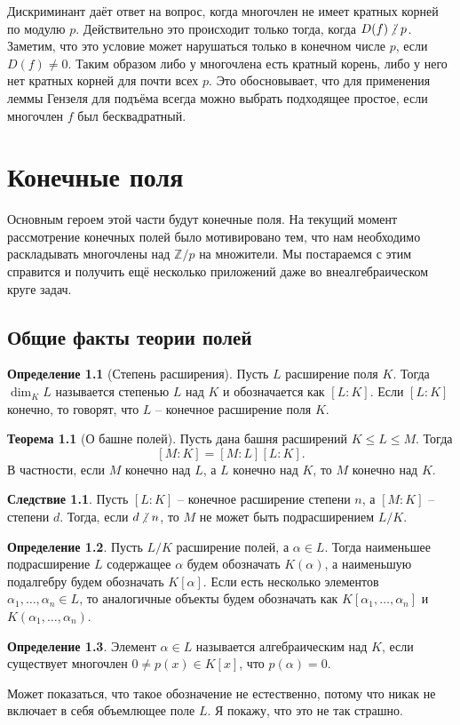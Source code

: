 \documentclass[10pt,a4paper,oneside]{book}
\theoremstyle{definition}
\newtheorem*{defn}{{\color{yellow!20!red} Определение}}
\newtheorem{thm}{{\color{red!40!black} Теорема}}
\newtheorem{cor}{Следствие}
\newcommand{\mb}[1]{\mathbb{#1}}
\newcommand{\ndi}{\mathop{\not\scalebox{0.85}{\raisebox{-1.2pt}[0.5\height]{\vdots}}\,}}
\def\thrm{\begin{thm}}
\def\ethrm{\end{thm}}
\def\dfn{\begin{defn}}
\def\edfn{\end{defn}}
\def\crl{\begin{cor}}
\def\ecrl{\end{cor}}
\begin{document}
Дискриминант даёт ответ на вопрос, когда многочлен не имеет кратных корней по модулю $p$. Действительно это происходит только тогда, когда $D(f)\ndi p$. Заметим, что это условие может нарушаться только в конечном числе $p$, если $D(f)\neq 0$. Таким образом либо у многочлена есть кратный корень, либо у него нет кратных корней для почти всех $p$. Это обосновывает, что для применения леммы Гензеля для подъёма всегда можно выбрать подходящее простое, если многочлен $f$ был бесквадратный.



\chapter{Конечные поля}
Основным героем этой части будут конечные поля. На текущий момент рассмотрение конечных полей было мотивировано тем, что нам необходимо раскладывать многочлены над $\mb Z/p$ на множители. Мы постараемся с этим справится и получить ещё несколько приложений даже во внеалгебраическом круге задач.


\section{Общие факты теории полей}
\dfn[Степень расширения] Пусть $L$ расширение поля $K$. Тогда $\dim_K L$ называется степенью $L$ над $K$ и обозначается как $[L: K]$. Если $[L: K]$ конечно, то говорят, что $L$ -- конечное расширение поля $K$. 
\edfn

\thrm[О башне полей] Пусть дана башня расширений $K\leq L \leq M$. Тогда 
$$[M: K]=[M: L][L: K].$$
В частности, если $M$ конечно над $L$, а $L$ конечно над $K$, то $M$ конечно над $K$.
\ethrm

\crl Пусть $[L: K]$ -- конечное расширение степени $n$, а $[M:K]$ -- степени $d$. Тогда, если $d \ndi n$, то $M$ не может быть подрасширением $L/K$.
\ecrl

\dfn Пусть $L/K$ расширение полей, а $\alpha \in L$. Тогда наименьшее подрасширение $L$ содержащее $\alpha$ будем обозначать $K(\alpha)$, а наименьшую подалгебру будем обозначать $K[\alpha]$. Если есть несколько элементов $\alpha_1,\dots,\alpha_n\in L$, то аналогичные объекты будем обозначать как $K[\alpha_1,\dots,\alpha_n]$ и $K(\alpha_1,\dots,\alpha_n)$.
\edfn

\dfn Элемент $\alpha \in L$ называется алгебраическим над $K$, если существует многочлен $0\neq p(x)\in K[x]$, что $p(\alpha)=0$. 
\edfn

Может показаться, что такое обозначение не естественно, потому что никак не включает в себя объемлющее поле $L$. Я покажу, что это не так страшно.
\end{document}
